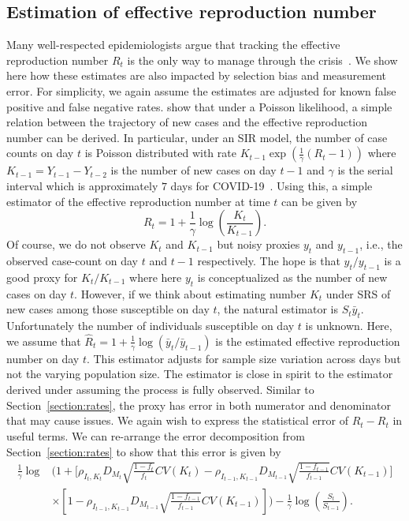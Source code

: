 \documentclass[aoas]{amsart}
\begin{document}
\subsection{Estimation of effective reproduction number}
\label{section:r0-estimation}
Many well-respected epidemiologists argue that tracking the effective reproduction number $R_t$ is the only way to manage through the crisis~\citep{Gabriel2020}.  We show here how these estimates are also impacted by selection bias and measurement error.  For simplicity, we again assume the estimates are adjusted for known false positive and false negative rates. \cite{Bettencourt2008} show that under a Poisson likelihood, a simple relation between the trajectory of new cases and the effective reproduction number can be derived.  In particular, under an SIR model, the number of case counts on day $t$ is Poisson distributed with rate $K_{t-1} \exp \left( \frac{1}{\gamma} (R_t - 1) \right)$ where $K_{t-1} = Y_{t-1}-Y_{t-2}$ is the number of new cases on day $t-1$ and $\gamma$ is the serial interval which is approximately $7$ days for COVID-19~\citep{Sanche2020}.  Using this, a simple estimator of the effective reproduction number at time $t$ can be given by
$$
R_t = 1 + \frac{1}{\gamma} \log \left( \frac{K_t}{K_{t-1}} \right).
$$
Of course, we do not observe $K_t$ and $K_{t-1}$ but noisy proxies $y_t$ and $y_{t-1}$, i.e., the observed case-count on day $t$ and $t-1$ respectively. The hope is that $y_t/y_{t-1}$ is a good proxy for $K_t/K_{t-1}$ where here $y_t$ is conceptualized as the number of new cases on day $t$. However, if we think about estimating number $K_t$ under SRS of new cases among those susceptible on day $t$, the natural estimator is $S_t \bar y_t$.  Unfortunately the number of individuals susceptible on day $t$ is unknown.  Here, we assume that $\hat R_t = 1 + \frac{1}{\gamma} \log \left( \bar y_t / \bar y_{t-1} \right)$ is the estimated effective reproduction number on day $t$.
This estimator adjusts for sample size variation across days but not the varying population size. The estimator is close in spirit to the estimator derived under assuming the process is fully observed.  Similar to Section~\ref{section:rates}, the proxy has error in both numerator and denominator that may cause issues.  We again wish to express the statistical error of $\hat R_t - R_t$ in useful terms.  We can re-arrange the error decomposition from Section~\ref{section:rates} to show that this error is given by
$$
\begin{aligned}
\frac{1}{\gamma}\log &\bigg( 1 + \bigg[ \rho_{I_t,K_t} D_{M_t} \sqrt{\frac{1-f_t}{f_t}} CV (K_t)  -\rho_{I_{t-1},K_{t-1}} D_{M_{t-1}} \sqrt{\frac{1-f_{t-1}}{f_{t-1}}} CV (K_{t-1}) \bigg] \\
&\times \left[ 1 - \rho_{I_{t-1},K_{t-1}} D_{M_{t-1}} \sqrt{\frac{1-f_{t-1}}{f_{t-1}}} CV (K_{t-1}) \right] \bigg) - \frac{1}{\gamma} \log \left( \frac{S_t}{S_{t-1}} \right).
\end{aligned}
$$
\end{document}

